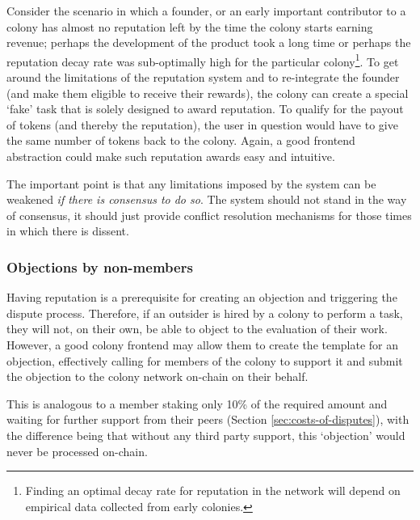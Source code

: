 Consider the scenario in which a founder, or an early important contributor to a colony has almost no reputation left by the time the colony starts earning revenue; perhaps the development of the product took a long time or perhaps the reputation decay rate was sub-optimally high for the particular colony\footnote{Finding an optimal decay rate for reputation in the network will depend on empirical data collected from early colonies.}. To get around the limitations of the reputation system and to re-integrate the founder (and make them eligible to receive their rewards), the colony can create a special `fake' task that is solely designed to award reputation. To qualify for the payout of tokens (and thereby the reputation), the user in question would have to give the same number of tokens back to the colony. Again, a good frontend abstraction could make such reputation awards easy and intuitive.

The important point is that any limitations imposed by the system can be weakened \emph{if there is consensus to do so}. The system should not stand in the way of consensus, it should just provide conflict resolution mechanisms for those times in which there is dissent.


\subsubsection{Objections by non-members}

Having reputation is a prerequisite for creating an objection and triggering the dispute process. Therefore, if an outsider is hired by a colony to perform a task, they will not, on their own, be able to object to the evaluation of their work. However, a good colony frontend may allow them to create the template for an objection, effectively calling for members of the colony to support it and submit the objection to the colony network on-chain on their behalf.  

This is analogous to a member staking only 10\% of the required amount and waiting for further support from their peers (Section \ref{sec:costs-of-disputes}), with the difference being that without any third party support, this `objection' would never be processed on-chain.